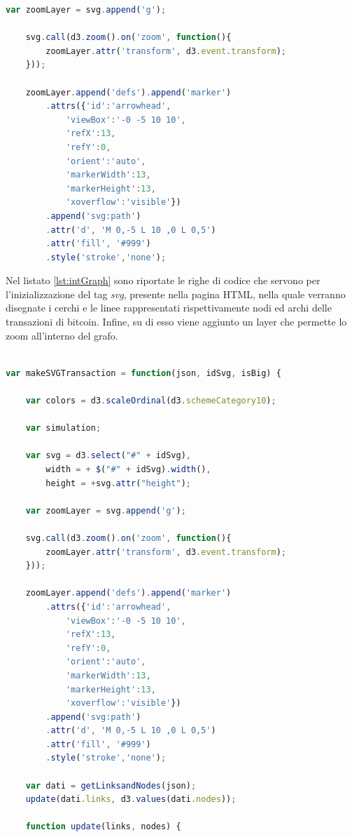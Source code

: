 \begin{itemize}
\begin{lstlisting}[language=Javascript, label=lst:intGraph, caption={Inizializzazione svg per il grafo.}]
    var zoomLayer = svg.append('g');

    svg.call(d3.zoom().on('zoom', function(){
        zoomLayer.attr('transform', d3.event.transform);
    }));

    zoomLayer.append('defs').append('marker')
        .attrs({'id':'arrowhead',
            'viewBox':'-0 -5 10 10',
            'refX':13,
            'refY':0,
            'orient':'auto',
            'markerWidth':13,
            'markerHeight':13,
            'xoverflow':'visible'})
        .append('svg:path')
        .attr('d', 'M 0,-5 L 10 ,0 L 0,5')
        .attr('fill', '#999')
        .style('stroke','none');
\end{lstlisting}

Nel listato \ref{lst:intGraph} sono riportate le righe di codice che servono per l'inizializzazione del tag \textit{svg}, presente nella pagina HTML, nella quale verranno disegnate i cerchi e le linee rappresentati rispettivamente nodi ed archi delle transazioni di bitcoin. Infine, su di esso viene aggiunto un layer che permette lo zoom all'interno del grafo.


\begin{lstlisting}[language=Javascript, label=lst:makeGraph, caption={Funzione per grafi.}]

var makeSVGTransaction = function(json, idSvg, isBig) {

    var colors = d3.scaleOrdinal(d3.schemeCategory10);

    var simulation;

    var svg = d3.select("#" + idSvg),
        width = + $("#" + idSvg).width(),
        height = +svg.attr("height");

    var zoomLayer = svg.append('g');

    svg.call(d3.zoom().on('zoom', function(){
        zoomLayer.attr('transform', d3.event.transform);
    }));

    zoomLayer.append('defs').append('marker')
        .attrs({'id':'arrowhead',
            'viewBox':'-0 -5 10 10',
            'refX':13,
            'refY':0,
            'orient':'auto',
            'markerWidth':13,
            'markerHeight':13,
            'xoverflow':'visible'})
        .append('svg:path')
        .attr('d', 'M 0,-5 L 10 ,0 L 0,5')
        .attr('fill', '#999')
        .style('stroke','none');

    var dati = getLinksandNodes(json);
    update(dati.links, d3.values(dati.nodes));

    function update(links, nodes) {


\end{lstlisting}
\end{itemize}
